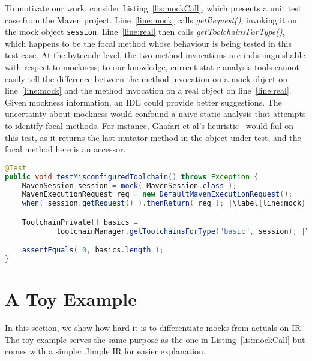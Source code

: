 To motivate our work, consider Listing~\ref{lis:mockCall}, which presents a unit test case from the Maven project. Line~\ref{line:mock} calls \textit{getRequest()}, invoking it on the mock object \texttt{session}. Line~\ref{line:real} then calls \textit{getToolchainsForType()}, which happens to be the focal method whose behaviour is being tested in this test case. At the bytecode level, the two method invocations are indistinguishable with respect to mockness; to our knowledge, current static analysis tools cannot easily tell the difference between the method invocation on a mock object on line~\ref{line:mock} and the method invocation on a real object on line~\ref{line:real}. Given mockness information, an IDE could provide better suggestions. The uncertainty about mockness would confound a naive static analysis that attempts to identify focal methods. For instance, Ghafari et al's heuristic~\cite{ghafari15:_autom} would fail on this test, as it returns the last mutator method in the object under test, and the focal method here is an accessor.

\begin{lstlisting}[basicstyle=\ttfamily, caption={This code snippet illustrates an example from maven-core, where calls to both the focal method \texttt{getToolchainsForType()} and to mock \texttt{session}'s \texttt{getRequest()} method occur in the test \textit{testMisconfiguredToolchain()}.},
basicstyle=\ttfamily,language = Java, framesep=4.5mm, escapechar=|,
framexleftmargin=1.0mm, captionpos=b, label=lis:mockCall, morekeywords={@Test}]
@Test
public void testMisconfiguredToolchain() throws Exception {
	MavenSession session = mock( MavenSession.class );
	MavenExecutionRequest req = new DefaultMavenExecutionRequest();
	when( session.getRequest() ).thenReturn( req ); |\label{line:mock}|

	ToolchainPrivate[] basics =
			toolchainManager.getToolchainsForType("basic", session); |\label{line:real}|

	assertEquals( 0, basics.length );
}
\end{lstlisting}

\section{A Toy Example}
\label{sec:toy-example}

In this section, we show how hard it is to differentiate mocks from actuals on IR. The toy example serves the same purpose as the one in Listing~\ref{lis:mockCall} but comes with a simpler Jimple IR for easier explanation.


